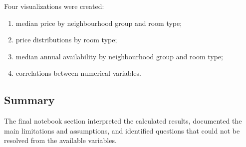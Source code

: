 Four visualizations were created:

\begin{enumerate}[label=\arabic*.]
    \item median price by neighbourhood group and room type;
    \item price distributions by room type;
    \item median annual availability by neighbourhood group and room type;
    \item correlations between numerical variables.
\end{enumerate}

\subsection{Summary}

The final notebook section interpreted the calculated results, documented the
main limitations and assumptions, and identified questions that could not be
resolved from the available variables.